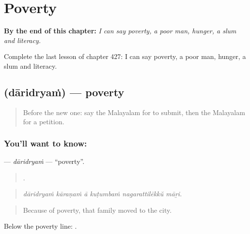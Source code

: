 
\chapter{Poverty}
\label{ch:ml-poverty}

\begin{chapteropening}
\textbf{By the end of this chapter:} \emph{I can say poverty, a poor man, hunger, a slum and literacy.}

Complete the last lesson of chapter 427: I can say poverty, a poor man, hunger, a slum and literacy.
\end{chapteropening}

\section[\texorpdfstring{\ml{ദാരിദ്ര്യം} (dāridryaṁ)}{ദാരിദ്ര്യം (dāridryaṁ)}]{ (dāridryaṁ) — poverty}

\label{lesson:ML-C427-daridryam}



\begin{quote}
Before the new one: say the Malayalam for to submit, then the Malayalam for a petition.
\end{quote}

\subsection*{You'll want to know: }
\textbf{} — \emph{dāridryaṁ} — \textquotedblleft{}poverty\textquotedblright{}.

\begin{quote}
     .
\end{quote}

\begin{quote}
\emph{dāridryaṁ kāraṇaṁ ā kuṭumbaṁ nagarattilēkkŭ māṟi.}
\end{quote}

\begin{quote}
Because of poverty, that family moved to the city.
\end{quote}

Below the poverty line:  .

